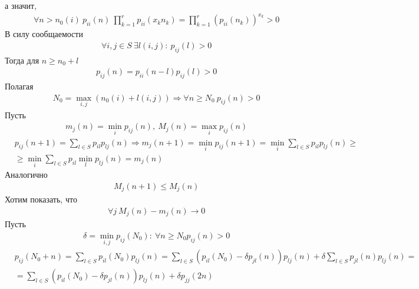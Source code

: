 \begin{Proof}
\begin{itemize}
        а значит,
        \begin{align*}
          & \forall n > n_0(i) \ p_{ii}(n) \ \prod_{k=1}^rp_{ii}(x_kn_k) = \prod_{k=1}^r\left( p_{ii}(n_k) \right)^{x_k} > 0
        \end{align*}
        В силу сообщаемости
        \begin{align*}
          & \forall i, j \in S \ \exists l(i,j): \ p_{ij}(l) > 0
        \end{align*}
        Тогда для $n \geq n_0 + l$
        \begin{align*}
          & p_{ij}(n) = p_{ii}(n-l)p_{ij}(l) > 0
        \end{align*}
        Полагая
        \begin{align*}
          & N_0 = \max_{i,j}\left( n_0(i)+l(i,j) \right) \Rightarrow \forall n \geq N_0 \ p_{ij}(n) > 0
        \end{align*}
        Пусть
        \begin{align*}
          & m_{j}(n) = \min_{i}p_{ij}(n), \ M_j(n) = \max_{i}p_{ij}(n)
        \end{align*}
        \begin{align*}
          & p_{ij}(n+1) = \sum_{l\in S} p_{il}p_{lj}(n) \Rightarrow m_{j}(n+1) = \min_{i} p_{ij}(n+1) = \min_{i}\sum_{l\in S} p_{il}p_{lj}(n) \geq \\
          & \geq \min_{i}\sum_{l\in S} p_{il}\min_l p_{lj}(n) = m_j(n)
        \end{align*}
        Аналогично
        \begin{align*}
          & M_{j}(n+1) \leq M_j(n)
        \end{align*}
        Хотим показать, что
        \begin{align*}
          & \forall j \ M_{j}(n) - m_j(n) \to 0
        \end{align*}
        Пусть
        \begin{align*}
          & \delta = \min_{i,j}p_{ij}(N_0): \ \forall n \geq N_0 p_{ij}(n) > 0
        \end{align*}
        \begin{align*}
          & p_{ij}(N_0+n) = \sum_{l \in S}p_{il}(N_0)p_{lj}(n) = \sum_{l \in S}\left( p_{il}(N_0) - \delta p_{jl}(n)\right) p_{lj}(n) + \delta \sum_{l \in S} p_{jl}(n) p_{lj}(n) = \\
          & = \sum_{l \in S}\left( p_{il}(N_0) - \delta p_{jl}(n)\right) p_{lj}(n) + \delta p_{jj}(2n)
        \end{align*}
        \begin{align*}

\end{align*}
\end{itemize}
\end{Proof}
